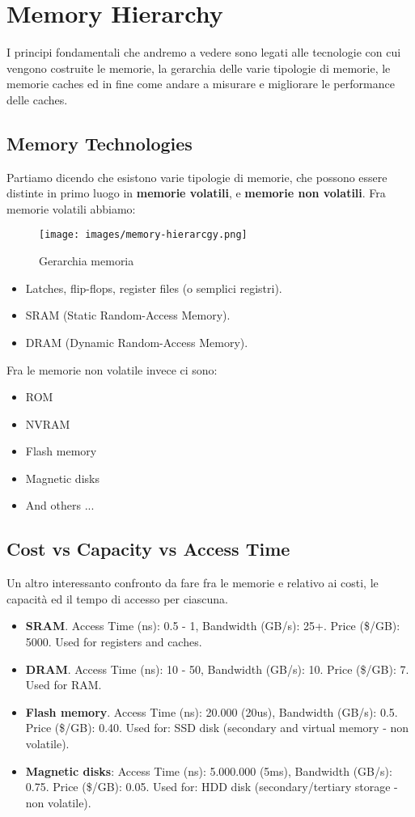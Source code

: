 \section{Memory Hierarchy}
I principi fondamentali che andremo a vedere sono legati alle tecnologie con cui vengono costruite le memorie, la gerarchia delle varie tipologie di memorie, le memorie caches ed in fine come andare a misurare e migliorare le performance delle caches.

\subsection{Memory Technologies}
Partiamo dicendo che esistono varie tipologie di memorie, che possono essere distinte in primo luogo in \textbf{memorie volatili}, e \textbf{memorie non volatili}. Fra memorie volatili abbiamo:
\begin{wrapfigure}{r}{5cm}
    \centering
    \texttt{[image: images/memory-hierarcgy.png]}
    \caption{Gerarchia memoria}
\end{wrapfigure}

\begin{itemize}
    \item Latches, flip-flops, register files (o semplici registri).
    \item SRAM (Static Random-Access Memory).
    \item DRAM (Dynamic Random-Access Memory).
\end{itemize}

\hspace{-15pt}Fra le memorie non volatile invece ci sono:
\begin{itemize}
    \item ROM
    \item NVRAM
    \item Flash memory
    \item Magnetic disks
    \item And others ...
\end{itemize}

\subsection{Cost vs Capacity vs Access Time}
Un altro interessanto confronto da fare fra le memorie e relativo ai costi, le capacità ed il tempo di accesso per ciascuna.
\begin{itemize}
    \item \textbf{SRAM}. Access Time (ns): 0.5 - 1, Bandwidth (GB/s): 25+. Price (\$/GB): 5000. Used for registers and caches.
    \item \textbf{DRAM}. Access Time (ns): 10 - 50, Bandwidth (GB/s): 10. Price (\$/GB): 7. Used for RAM.
    \item \textbf{Flash memory}. Access Time (ns): 20.000 (20us), Bandwidth (GB/s): 0.5. Price (\$/GB): 0.40. Used for: SSD disk (secondary and virtual memory - non volatile).
    \item \textbf{Magnetic disks}: Access Time (ns): 5.000.000 (5ms), Bandwidth (GB/s): 0.75. Price (\$/GB): 0.05. Used for: HDD disk (secondary/tertiary storage - non volatile).
\end{itemize}

